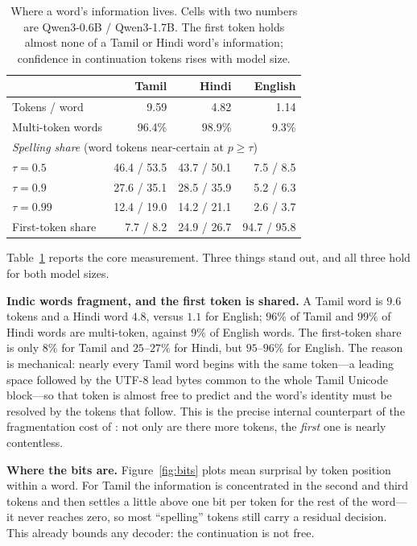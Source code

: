 \documentclass[11pt]{article}
\begin{document}
\begin{table}[t]
\centering\small
\begin{tabular}{lrrr}
\toprule
 & Tamil & Hindi & English \\
\midrule
Tokens / word & 9.59 & 4.82 & 1.14 \\
Multi-token words & 96.4\% & 98.9\% & 9.3\% \\
\midrule
\multicolumn{4}{l}{\emph{Spelling share} (word tokens near-certain at $p\ge\tau$)}\\
\quad $\tau=0.5$ & 46.4 / 53.5 & 43.7 / 50.1 & 7.5 / 8.5 \\
\quad $\tau=0.9$ & 27.6 / 35.1 & 28.5 / 35.9 & 5.2 / 6.3 \\
\quad $\tau=0.99$ & 12.4 / 19.0 & 14.2 / 21.1 & 2.6 / 3.7 \\
\midrule
First-token share & 7.7 / 8.2 & 24.9 / 26.7 & 94.7 / 95.8 \\
\bottomrule
\end{tabular}
\caption{Where a word's information lives. Cells with two numbers are
Qwen3-0.6B / Qwen3-1.7B. The first token holds almost none of a Tamil or Hindi
word's information; confidence in continuation tokens rises with model size.}
\label{tab:spelling}
\end{table}

Table~\ref{tab:spelling} reports the core measurement. Three things stand out,
and all three hold for both model sizes.

\textbf{Indic words fragment, and the first token is shared.} A Tamil word is
$9.6$ tokens and a Hindi word $4.8$, versus $1.1$ for English; $96\%$ of Tamil
and $99\%$ of Hindi words are multi-token, against $9\%$ of English words. The
first-token share is only $8\%$ for Tamil and $25$--$27\%$ for Hindi, but
$95$--$96\%$ for English. The reason is mechanical: nearly every Tamil word
begins with the same token---a leading space followed by the UTF-8 lead bytes
common to the whole Tamil Unicode block---so that token is almost free to
predict and the word's identity must be resolved by the tokens that follow.
This is the precise internal counterpart of the fragmentation cost of
\citet{petrov2023tokenizers}: not only are there more tokens, the \emph{first}
one is nearly contentless.

\textbf{Where the bits are.} Figure~\ref{fig:bits} plots mean surprisal by
token position within a word. For Tamil the information is concentrated in the
second and third tokens and then settles a little above one bit per token for
the rest of the word---it never reaches zero, so most ``spelling'' tokens still
carry a residual decision. This already bounds any decoder: the continuation is
not free.
\end{document}
